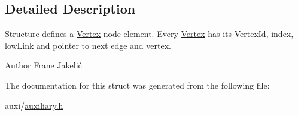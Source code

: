 \subsection{Detailed Description}
Structure defines a \hyperlink{structVertex}{Vertex} node element. Every \hyperlink{structVertex}{Vertex} has its Vertex\+Id, index, low\+Link and pointer to next edge and vertex. 

\begin{DoxyAuthor}{Author}
Frane Jakelić 
\end{DoxyAuthor}


The documentation for this struct was generated from the following file\+:\begin{DoxyCompactItemize}
\item 
auxi/\hyperlink{auxiliary_8h}{auxiliary.\+h}\end{DoxyCompactItemize}
